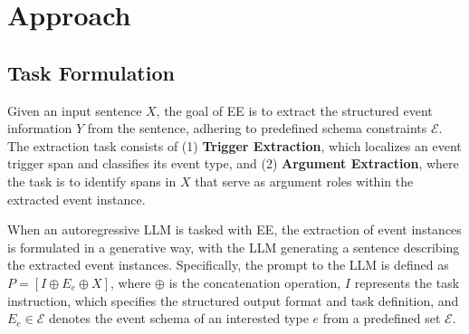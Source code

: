 \section{Approach}\label{sec:approach}


\subsection{Task Formulation}
\label{sec:formulation}
Given an input sentence \( X \), the goal of EE is to extract the structured event information $Y$ from the sentence, adhering to predefined schema constraints $\mathcal{E}$. The extraction task consists of (1) \textbf{Trigger Extraction}, which localizes an event trigger span and classifies its event type, and (2) \textbf{Argument Extraction}, where the task is to identify spans in \( X \) that serve as argument roles within the extracted event instance.  

When an autoregressive LLM is tasked with EE, the extraction of event instances is formulated in a generative way, with the LLM generating a sentence describing the extracted event instances. Specifically, the prompt to the LLM is defined as  $P = [I \oplus {E}_e \oplus X]$, where \(\oplus\) is the concatenation operation, \( I \) represents the {task instruction}, which specifies the structured output format and task definition, and \( {E}_e \in \mathcal{E}\) denotes the {event schema} of an interested type $e$ from a predefined set $\mathcal{E}$.


